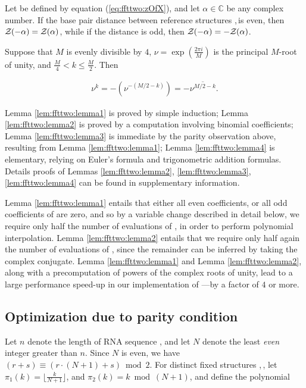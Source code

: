 \begin{lemma}
\label{lem:ffttwo:lemma3}
Let \emZ{} be defined by equation (\ref{eq:ffttwo:zOfX}), and
let $\alpha \in \mathbb{C}$ be any complex number.
If the base pair distance between reference
structures \strA,\,\strB is even, then ${\mathcal Z}_{}(-\alpha) = {\mathcal Z}_{}(\alpha)$,
while if
the distance is odd, then ${\mathcal Z}_{}(-\alpha) = -{\mathcal Z}_{}(\alpha)$.
\end{lemma}

\begin{lemma}
\label{lem:ffttwo:lemma4}
Suppose that $M$ is evenly divisible by $4$,
$\nu = \exp(\frac{2 \pi i}{M})$ is the principal $M$-root of unity, and
$\frac{M}{4} < k \leq \frac{M}{2}$. Then

\begin{align}
\nu^k = -(\nu^{-(M/2-k)}) = -\overline{\nu^{M/2-k}}.
\end{align}
\end{lemma}

Lemma \ref{lem:ffttwo:lemma1} is proved by simple induction;
Lemma \ref{lem:ffttwo:lemma2}
is proved by a computation involving binomial coefficients;
Lemma \ref{lem:ffttwo:lemma3} is immediate
by the parity observation above, resulting from Lemma \ref{lem:ffttwo:lemma1};
Lemma \ref{lem:ffttwo:lemma4} is elementary, relying on Euler's
formula and trigonometric addition formulas. Details proofs of
Lemmas \ref{lem:ffttwo:lemma2}, \ref{lem:ffttwo:lemma3}, \ref{lem:ffttwo:lemma4}
can be found in supplementary information.

Lemma \ref{lem:ffttwo:lemma1}
entails that either all even coefficients, or all odd coefficients
of \emZ{} are zero, and so by a variable change described in detail below,
we require only half the number of evaluations of \emZ{}, in order to perform
polynomial interpolation.
Lemma \ref{lem:ffttwo:lemma2}
 entails that we require only half again the number of evaluations of
\emZ{}, since the remainder can be inferred by taking the complex conjugate.
Lemma \ref{lem:ffttwo:lemma1} and Lemma \ref{lem:ffttwo:lemma2},
along with a
precomputation of powers of the complex roots of unity, lead to a
large performance speed-up in our implementation of \ffttwo---by a factor
of $4$ or more.

\subsection{Optimization due to parity condition}
\label{subsec:ffttwo:parity}

Let $n$ denote the length of RNA sequence \seq, and let $N$ denote the
least {\em even} integer greater than $n$. Since $N$ is even,
we have $(r+s) \equiv (r\cdot(N+1)+s) \bmod 2$. For distinct
fixed structures \strA,\,\strB, let
$\pi_1(k) = \lfloor \frac{k}{N+1} \rfloor$, and
$\pi_2(k) = k \bmod (N+1)$, and define the polynomial

